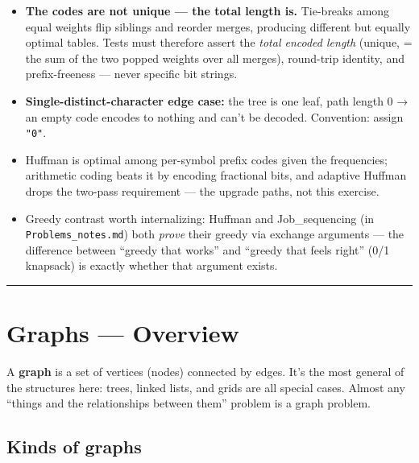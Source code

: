 \documentclass[
  10pt,
  letterpaper,
  onecolumn]{article}
\providecommand{\tightlist}{%
  \setlength{\itemsep}{0pt}\setlength{\parskip}{0pt}}
\begin{document}
\begin{itemize}
\tightlist
\item
  \textbf{The codes are not unique --- the total length is.} Tie-breaks
  among equal weights flip siblings and reorder merges, producing
  different but equally optimal tables. Tests must therefore assert the
  \emph{total encoded length} (unique, = the sum of the two popped
  weights over all merges), round-trip identity, and prefix-freeness ---
  never specific bit strings.
\item
  \textbf{Single-distinct-character edge case:} the tree is one leaf,
  path length 0 → an empty code encodes to nothing and can't be decoded.
  Convention: assign \texttt{"0"}.
\item
  Huffman is optimal among per-symbol prefix codes given the
  frequencies; arithmetic coding beats it by encoding fractional bits,
  and adaptive Huffman drops the two-pass requirement --- the upgrade
  paths, not this exercise.
\item
  Greedy contrast worth internalizing: Huffman and Job\_sequencing (in
  \texttt{Problems\_notes.md}) both \emph{prove} their greedy via
  exchange arguments --- the difference between ``greedy that works''
  and ``greedy that feels right'' (0/1 knapsack) is exactly whether that
  argument exists.
\end{itemize}

\begin{center}\rule{0.5\linewidth}{0.5pt}\end{center}

\hypertarget{graphs-overview}{%
\section{Graphs --- Overview}\label{graphs-overview}}

A \textbf{graph} is a set of vertices (nodes) connected by edges. It's
the most general of the structures here: trees, linked lists, and grids
are all special cases. Almost any ``things and the relationships between
them'' problem is a graph problem.

\hypertarget{kinds-of-graphs}{%
\subsection{Kinds of graphs}\label{kinds-of-graphs}}
\end{document}
